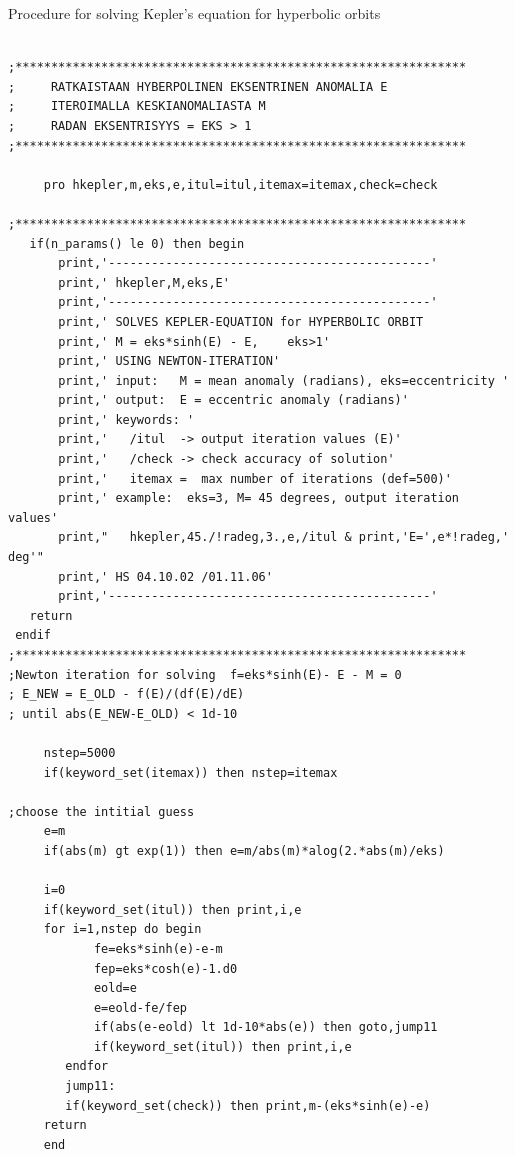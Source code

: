 \documentclass[a4paper,12pt]{article}
\def\red{\color{red}}
\def\black{\color{RGBblack}}
\begin{document}
{{{\newpage
\black

{\medb
Procedure for solving Kepler's equation for hyperbolic orbits} 


{\red \scriptsize
\begin{verbatim}

;***************************************************************
;     RATKAISTAAN HYBERPOLINEN EKSENTRINEN ANOMALIA E
;     ITEROIMALLA KESKIANOMALIASTA M
;     RADAN EKSENTRISYYS = EKS > 1
;***************************************************************

     pro hkepler,m,eks,e,itul=itul,itemax=itemax,check=check

;***************************************************************
   if(n_params() le 0) then begin
       print,'---------------------------------------------'
       print,' hkepler,M,eks,E'
       print,'---------------------------------------------'
       print,' SOLVES KEPLER-EQUATION for HYPERBOLIC ORBIT
       print,' M = eks*sinh(E) - E,    eks>1' 
       print,' USING NEWTON-ITERATION'
       print,' input:   M = mean anomaly (radians), eks=eccentricity '
       print,' output:  E = eccentric anomaly (radians)'
       print,' keywords: '
       print,'   /itul  -> output iteration values (E)'
       print,'   /check -> check accuracy of solution'
       print,'   itemax =  max number of iterations (def=500)'
       print,' example:  eks=3, M= 45 degrees, output iteration values'
       print,"   hkepler,45./!radeg,3.,e,/itul & print,'E=',e*!radeg,' deg'"
       print,' HS 04.10.02 /01.11.06'
       print,'---------------------------------------------'
   return
 endif
;***************************************************************
;Newton iteration for solving  f=eks*sinh(E)- E - M = 0
; E_NEW = E_OLD - f(E)/(df(E)/dE)
; until abs(E_NEW-E_OLD) < 1d-10

     nstep=5000
     if(keyword_set(itemax)) then nstep=itemax

;choose the intitial guess
     e=m
     if(abs(m) gt exp(1)) then e=m/abs(m)*alog(2.*abs(m)/eks)

     i=0
     if(keyword_set(itul)) then print,i,e
     for i=1,nstep do begin
            fe=eks*sinh(e)-e-m
            fep=eks*cosh(e)-1.d0
            eold=e
            e=eold-fe/fep
            if(abs(e-eold) lt 1d-10*abs(e)) then goto,jump11
            if(keyword_set(itul)) then print,i,e
        endfor
        jump11: 
        if(keyword_set(check)) then print,m-(eks*sinh(e)-e)
     return
     end



\end{verbatim}}}}}
\end{document}
